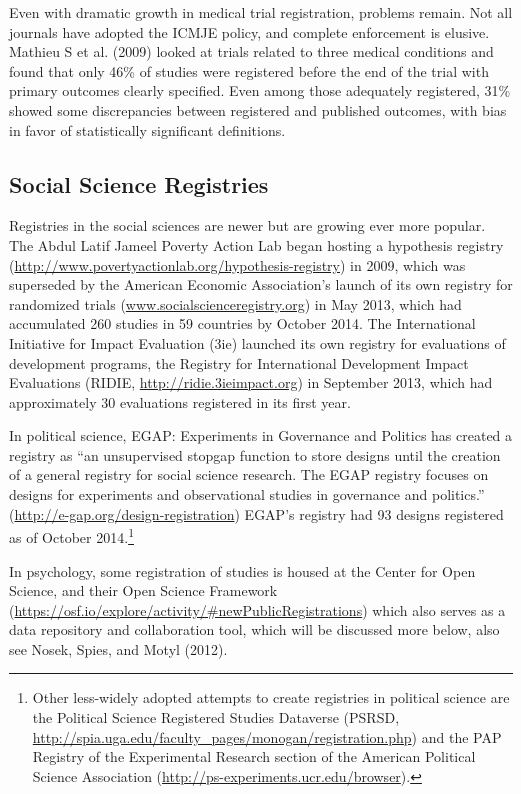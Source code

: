 \documentclass[12pt] {article}
\begin{document}
Even with dramatic growth in medical trial registration, problems
remain. Not all journals have adopted the ICMJE policy, and complete
enforcement is elusive. Mathieu S et al. (2009) looked at trials related
to three medical conditions and found that only 46\% of studies were
registered before the end of the trial with primary outcomes clearly
specified. Even among those adequately registered, 31\% showed some
discrepancies between registered and published outcomes, with bias in
favor of statistically significant definitions.

\subsection{Social Science Registries}\label{social-science-registries}

Registries in the social sciences are newer but are growing ever more
popular. The Abdul Latif Jameel Poverty Action Lab began hosting a
hypothesis registry
(\url{http://www.povertyactionlab.org/hypothesis-registry}) in 2009,
which was superseded by the American Economic Association's launch of
its own registry for randomized trials
(\href{http://www.socialscienceregistry.org}{www.socialscienceregistry.org})
in May 2013, which had accumulated 260 studies in 59 countries by
October 2014. The International Initiative for Impact Evaluation (3ie)
launched its own registry for evaluations of development programs, the
Registry for International Development Impact Evaluations (RIDIE,
\url{http://ridie.3ieimpact.org}) in September 2013, which had
approximately 30 evaluations registered in its first year.

In political science, EGAP: Experiments in Governance and Politics has
created a registry as ``an unsupervised stopgap function to store
designs until the creation of a general registry for social science
research. The EGAP registry focuses on designs for experiments and
observational studies in governance and politics.''
(\url{http://e-gap.org/design-registration}) EGAP's registry had 93
designs registered as of October 2014.\footnote{Other less-widely
  adopted attempts to create registries in political science are the
  Political Science Registered Studies Dataverse (PSRSD,
  \href{../customXml/item1.xml}{http://spia.uga.edu/faculty\_pages/monogan/registration.php})
  and the PAP Registry of the Experimental Research section of the
  American Political Science Association
  (\href{numbering.xml}{http://ps-experiments.ucr.edu/browser}).}

In psychology, some registration of studies is housed at the Center for
Open Science, and their Open Science Framework
(\hyperref[newPublicRegistrations]{https://osf.io/explore/activity/\#newPublicRegistrations})
which also serves as a data repository and collaboration tool, which
will be discussed more below, also see Nosek, Spies, and Motyl (2012).
\end{document}
